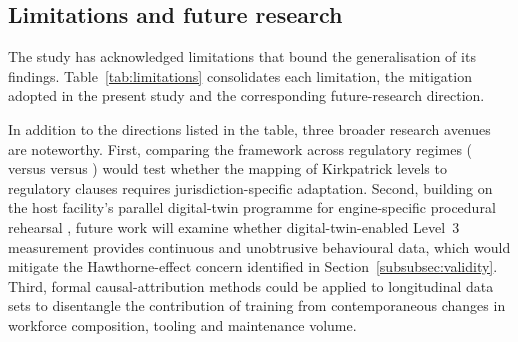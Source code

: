 \subsection{Limitations and future research}
\label{subsec:limitations}

The study has acknowledged limitations that bound the generalisation of its
findings. Table~\ref{tab:limitations} consolidates each limitation, the
mitigation adopted in the present study and the corresponding future-research
direction.



In addition to the directions listed in the table, three broader research
avenues are noteworthy. First, comparing the framework across regulatory
regimes (\FAA{} versus \EASA{} versus \ANAC{}) would test whether the
mapping of Kirkpatrick levels to regulatory clauses requires
jurisdiction-specific adaptation. Second, building on the host facility's
parallel digital-twin programme for engine-specific procedural rehearsal
\citep{Garcia2024}, future work will examine whether digital-twin-enabled
Level~3 measurement provides continuous and unobtrusive behavioural data,
which would mitigate the Hawthorne-effect concern identified in
Section~\ref{subsubsec:validity}. Third, formal causal-attribution methods
\citep{Fernandez2024} could be applied to longitudinal data sets to
disentangle the contribution of training from contemporaneous changes in
workforce composition, tooling and maintenance volume.
